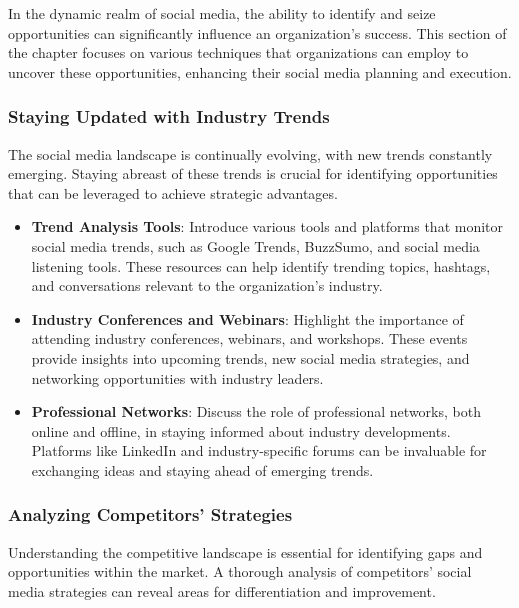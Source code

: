 \documentclass[
]{book}
\providecommand{\tightlist}{%
  \setlength{\itemsep}{0pt}\setlength{\parskip}{0pt}}
\begin{document}
In the dynamic realm of social media, the ability to identify and seize opportunities can significantly influence an organization's success. This section of the chapter focuses on various techniques that organizations can employ to uncover these opportunities, enhancing their social media planning and execution.

\hypertarget{staying-updated-with-industry-trends}{%
\subsubsection*{Staying Updated with Industry Trends}\label{staying-updated-with-industry-trends}}

The social media landscape is continually evolving, with new trends constantly emerging. Staying abreast of these trends is crucial for identifying opportunities that can be leveraged to achieve strategic advantages.

\begin{itemize}
\tightlist
\item
  \textbf{Trend Analysis Tools}: Introduce various tools and platforms that monitor social media trends, such as Google Trends, BuzzSumo, and social media listening tools. These resources can help identify trending topics, hashtags, and conversations relevant to the organization's industry.
\item
  \textbf{Industry Conferences and Webinars}: Highlight the importance of attending industry conferences, webinars, and workshops. These events provide insights into upcoming trends, new social media strategies, and networking opportunities with industry leaders.
\item
  \textbf{Professional Networks}: Discuss the role of professional networks, both online and offline, in staying informed about industry developments. Platforms like LinkedIn and industry-specific forums can be invaluable for exchanging ideas and staying ahead of emerging trends.
\end{itemize}

\hypertarget{analyzing-competitors-strategies}{%
\subsubsection*{Analyzing Competitors' Strategies}\label{analyzing-competitors-strategies}}

Understanding the competitive landscape is essential for identifying gaps and opportunities within the market. A thorough analysis of competitors' social media strategies can reveal areas for differentiation and improvement.
\end{document}
